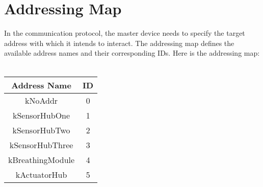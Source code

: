 \section{Addressing Map}
In the communication protocol, the master device needs to specify the target address with which it intends to interact. The addressing map defines the available address names and their corresponding IDs. Here is the addressing map: \\\\
\begin{tabular}{|c|c|}
    \hline
    \textbf{Address Name} & ID \\
    \hline
    kNoAddr & 0 \\
    \hline
    kSensorHubOne & 1 \\
    \hline
    kSensorHubTwo & 2 \\
    \hline
    kSensorHubThree & 3 \\
    \hline
    kBreathingModule & 4 \\
    \hline
    kActuatorHub & 5 \\
    \hline
\end{tabular}

